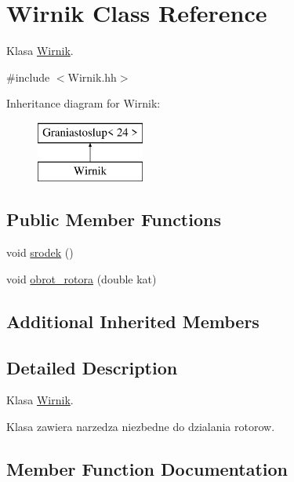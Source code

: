 \hypertarget{class_wirnik}{}\section{Wirnik Class Reference}
\label{class_wirnik}


Klasa \mbox{\hyperlink{class_wirnik}{Wirnik}}.  




{\ttfamily \#include $<$Wirnik.\+hh$>$}

Inheritance diagram for Wirnik\+:\begin{figure}[H]
\begin{center}
\leavevmode
\includegraphics[height=2.000000cm]{class_wirnik}
\end{center}
\end{figure}
\subsection*{Public Member Functions}
\begin{DoxyCompactItemize}
\item 
void \mbox{\hyperlink{class_wirnik_a1237f4a0ac3638eed06b6f642814b217}{srodek}} ()
\item 
void \mbox{\hyperlink{class_wirnik_af9775acddcb0a1a37ce4049eaef606b1}{obrot\+\_\+rotora}} (double kat)
\end{DoxyCompactItemize}
\subsection*{Additional Inherited Members}


\subsection{Detailed Description}
Klasa \mbox{\hyperlink{class_wirnik}{Wirnik}}. 

Klasa zawiera narzedza niezbedne do dzialania rotorow. 

\subsection{Member Function Documentation}
\mbox{\label{class_wirnik_af9775acddcb0a1a37ce4049eaef606b1}} 

